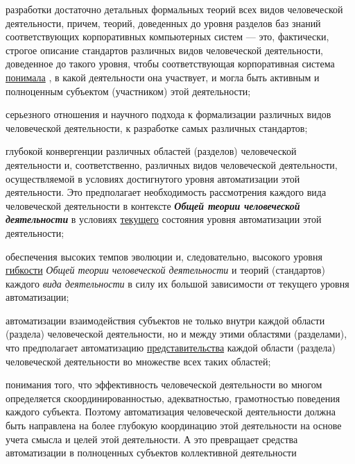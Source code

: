 \begin{scnsubstruct}
{        \begin{scnitemize}
            \item разработки достаточно детальных формальных теорий всех видов человеческой деятельности, причем, теорий, доведенных до уровня разделов баз знаний соответствующих корпоративных компьютерных систем --- это, фактически, строгое описание стандартов различных видов человеческой деятельности, доведенное до такого уровня, чтобы соответствующая корпоративная система \underline{понимала} , в какой деятельности она участвует, и могла быть активным и полноценным субъектом (участником) этой деятельности;
            \item серьезного отношения и научного подхода к формализации различных видов человеческой деятельности, к разработке самых различных стандартов;
            \item глубокой конвергенции различных областей (разделов) человеческой деятельности и, соответственно, различных видов человеческой деятельности, осуществляемой в условиях достигнутого уровня автоматизации этой деятельности. Это предполагает необходимость рассмотрения каждого вида человеческой деятельности в контексте \textbf{\textit{Общей теории человеческой деятельности}} в условиях \underline{текущего} состояния уровня автоматизации этой деятельности;
            \item обеспечения высоких темпов эволюции и, следовательно, высокого уровня \underline{гибкости} \textit{Общей теории человеческой деятельности} и теорий (стандартов) каждого \textit{вида деятельности} в силу их большой зависимости от текущего уровня автоматизации;
            \item автоматизации взаимодействия субъектов не только внутри каждой области (раздела) человеческой деятельности, но и между этими областями (разделами), что предполагает автоматизацию \underline{представительства} каждой области (раздела) человеческой деятельности во множестве всех таких областей;
            \item понимания того, что эффективность человеческой деятельности во многом определяется скоординированностью, адекватностью, грамотностью поведения каждого субъекта. Поэтому автоматизация человеческой деятельности должна быть направлена на более глубокую координацию этой деятельности на основе учета смысла и целей этой деятельности. А это превращает средства автоматизации в полноценных субъектов коллективной деятельности
        \end{scnitemize}
    }
    \bigskip
    \bigskip
    

\end{scnsubstruct}
